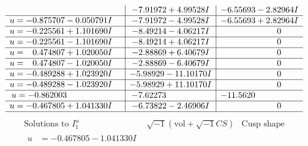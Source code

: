 \documentclass[1p]{elsarticle_modified}
\theoremstyle{definition}
\newcommand{\I}{\sqrt{-1}}
\begin{document}
$$\begin{array}{c|c|c}
 & -7.91972 + 4.99528 I & -6.55693 - 2.82964 I \\ \hline\begin{aligned}
u &= -0.875707 - 0.050791 I\end{aligned}
 & -7.91972 - 4.99528 I & -6.55693 + 2.82964 I \\ \hline\begin{aligned}
u &= -0.225561 + 1.101690 I\end{aligned}
 & -8.49214 - 4.06217 I & \phantom{-0.000000 } 0 \\ \hline\begin{aligned}
u &= -0.225561 - 1.101690 I\end{aligned}
 & -8.49214 + 4.06217 I & \phantom{-0.000000 } 0 \\ \hline\begin{aligned}
u &= \phantom{-}0.474807 + 1.020050 I\end{aligned}
 & -2.88869 + 6.40679 I & \phantom{-0.000000 } 0 \\ \hline\begin{aligned}
u &= \phantom{-}0.474807 - 1.020050 I\end{aligned}
 & -2.88869 - 6.40679 I & \phantom{-0.000000 } 0 \\ \hline\begin{aligned}
u &= -0.489288 + 1.023920 I\end{aligned}
 & -5.98929 - 11.10170 I & \phantom{-0.000000 } 0 \\ \hline\begin{aligned}
u &= -0.489288 - 1.023920 I\end{aligned}
 & -5.98929 + 11.10170 I & \phantom{-0.000000 } 0 \\ \hline\begin{aligned}
u &= -0.862003\phantom{ +0.000000I}\end{aligned}
 & -7.62273\phantom{ +0.000000I} & -11.5620\phantom{ +0.000000I} \\ \hline\begin{aligned}
u &= -0.467805 + 1.041330 I\end{aligned}
 & -6.73822 - 2.46906 I & \phantom{-0.000000 } 0\\
 \hline 
 \end{array}$$\newpage$$\begin{array}{c|c|c}  
\text{Solutions to }I^u_{1}& \I (\text{vol} + \sqrt{-1}CS) & \text{Cusp shape}\\
 \hline 
\begin{aligned}
u &= -0.467805 - 1.041330 I\end{aligned}

\end{array}$$
\end{document}
